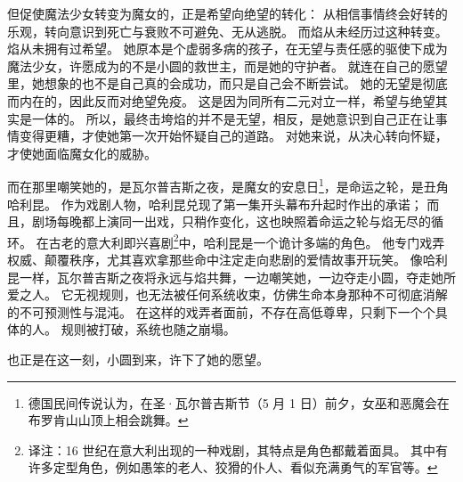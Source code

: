 但促使魔法少女转变为魔女的，正是希望向绝望的转化：
从相信事情终会好转的乐观，转向意识到死亡与衰败不可避免、无从逃脱。
而焰从未经历过这种转变。
焰从未拥有过希望。
她原本是个虚弱多病的孩子，在无望与责任感的驱使下成为魔法少女，许愿成为的不是小圆的救世主，而是她的守护者。
就连在自己的愿望里，她想象的也不是自己真的会成功，而只是自己会不断尝试。
她的无望是彻底而内在的，因此反而对绝望免疫。
这是因为同所有二元对立一样，希望与绝望其实是一体的。
所以，最终击垮焰的并不是无望，相反，是她意识到自己正在让事情变得更糟，才使她第一次开始怀疑自己的道路。
对她来说，从决心转向怀疑，才使她面临魔女化的威胁。

而在那里嘲笑她的，是瓦尔普吉斯之夜，是魔女的安息日\footnote{%
    德国民间传说认为，在圣·瓦尔普吉斯节（5 月 1 日）前夕，女巫和恶魔会在布罗肯山山顶上相会跳舞。
}\cite{cooper2007walpurgis}，是命运之轮，是丑角哈利昆。
作为戏剧人物，哈利昆兑现了第一集开头幕布升起时作出的承诺；
而且，剧场每晚都上演同一出戏，只稍作变化，这也映照着命运之轮与焰无尽的循环。
在古老的意大利即兴喜剧\footnote{%
    译注：16 世纪在意大利出现的一种戏剧，其特点是角色都戴着面具。
    其中有许多定型角色，例如愚笨的老人、狡猾的仆人、看似充满勇气的军官等。
}中，哈利昆是一个诡计多端的角色。
他专门戏弄权威、颠覆秩序，尤其喜欢拿那些命中注定走向悲剧的爱情故事开玩笑\cite{oreglia1982commedia}。
像哈利昆一样，瓦尔普吉斯之夜将永远与焰共舞，一边嘲笑她，一边夺走小圆，夺走她所爱之人。
它无视规则，也无法被任何系统收束，仿佛生命本身那种不可彻底消解的不可预测性与混沌。
在这样的戏弄者面前，不存在高低尊卑，只剩下一个个具体的人。
规则被打破，系统也随之崩塌。

也正是在这一刻，小圆到来，许下了她的愿望。
